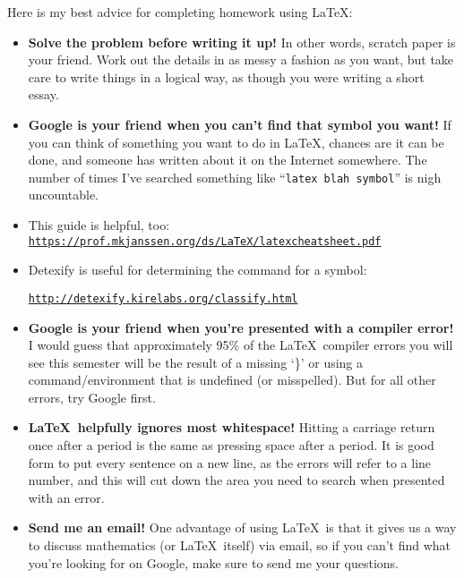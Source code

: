 \documentclass[11pt]{amsart}
\theoremstyle{plain}
\theoremstyle{definition}
\begin{document}
Here is my best advice for completing homework using \LaTeX:
\begin{itemize}\renewcommand{\labelitemi}{$\diamond$}
	\item \textbf{Solve the problem before writing it up!} In other words, scratch paper is your friend. Work out the details in as messy a fashion as you want, but take care to write things in a logical way, as though you were writing a short essay.
	\item \textbf{Google is your friend when you can't find that symbol you want!} If you can think of something you want to do in \LaTeX, chances are it can be done, and someone has written about it on the Internet somewhere.  The number of times I've searched something like ``{\tt latex blah symbol}'' is nigh uncountable.
	\item This guide is helpful, too: {\tt \href{https://prof.mkjanssen.org/ds/LaTeX/latexcheatsheet.pdf}{https://prof.mkjanssen.org/ds/LaTeX/latexcheatsheet.pdf}}
	\item Detexify is useful for determining the command for a symbol: 
	
	{\tt \href{http://detexify.kirelabs.org/classify.html}{http://detexify.kirelabs.org/classify.html}}
	\item \textbf{Google is your friend when you're presented with a compiler error!} I would guess that approximately 95\% of the \LaTeX\ compiler errors you will see this semester will be the result of a missing `\}' or using a command/environment that is undefined (or misspelled). But for all other errors, try Google first.
	\item \textbf{\LaTeX\ helpfully ignores most whitespace!} Hitting a carriage return once after a period is the same as pressing space after a period. It is good form to put every sentence on a new line, as the errors will refer to a line number, and this will cut down the area you need to search when presented with an error.
	\item \textbf{Send me an email!} One advantage of using \LaTeX\ is that it gives us a way to discuss mathematics (or \LaTeX\ itself) via email, so if you can't find what you're looking for on Google, make sure to send me your questions. 
\end{itemize}
\end{document}
